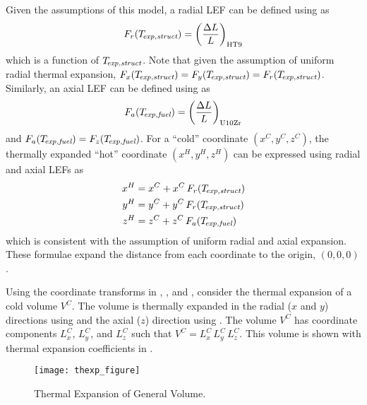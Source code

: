     Given the assumptions of this model, a radial LEF can be defined using 
     as
    \begin{equation}
      \label{eq:lef_r}
      F_r(T_{\!\mbox{\scriptsize \em exp,struct}}) = \left(\frac{\Delta L}{L}\right)_{\text{HT9}}
    \end{equation}
    which is a function of $T_{\!\mbox{\scriptsize \em exp,struct}}$. Note that given the assumption of 
    uniform radial thermal expansion, ${F_x(T_{\!\mbox{\scriptsize \em exp,struct}}) = F_y(T_{\!\mbox{\scriptsize \em exp,struct}}) =
    F_r(T_{\!\mbox{\scriptsize \em exp,struct}})}$.
    Similarly, an axial LEF can be defined using  as 
    \begin{equation}
      \label{eq:lef_a}
      F_a({T_{\!\mbox{\scriptsize \em exp,fuel}}}) = \left(\frac{\Delta L}{L}\right)_{\text{U10Zr}}
    \end{equation}
    and $F_a({T_{\!\mbox{\scriptsize \em exp,fuel}}}) = F_z({T_{\!\mbox{\scriptsize \em exp,fuel}}})$. For a ``cold'' coordinate 
    $(x^C,y^C,z^C)$, the thermally expanded ``hot'' coordinate $(x^H,y^H,z^H)$ 
    can be expressed using radial and axial LEFs as
    \begin{align}
      \label{eq:expand_x}
      x^H &= x^C + x^C \, F_r(T_{\!\mbox{\scriptsize \em exp,struct}}) \\
      \label{eq:expand_y}
      y^H &= y^C + y^C \, F_r(T_{\!\mbox{\scriptsize \em exp,struct}}) \\
      \label{eq:expand_z}
      z^H &= z^C + z^C \, F_a({T_{\!\mbox{\scriptsize \em exp,fuel}}})
    \end{align}
    which is consistent with the assumption of uniform radial and axial 
    expansion. These formulae expand the distance from each coordinate to the
    origin, $(0,0,0)$.

    Using the coordinate transforms in , , 
    and , consider the thermal expansion of a cold volume 
    $V^C$. The volume is thermally expanded in the radial ($x$ and $y$) 
    directions using  and the axial ($z$) direction using 
    . The volume $V^C$ has coordinate components $L_x^C$, 
    $L_y^C$, and $L_z^C$ such that ${V^C = L_x^C \, L_y^C \, L_z^C}$. This 
    volume is shown with thermal expansion coefficients in 
    .

    \begin{figure}
      \centering
      \texttt{[image: thexp\_figure]}
      \caption{Thermal Expansion of General Volume.}
      \label{fig:thexp_figure}
    \end{figure}
    
